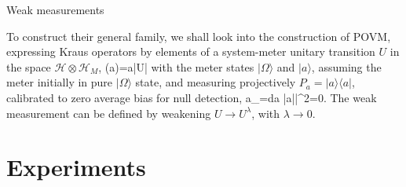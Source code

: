 \documentclass{beamer}
\def\be#1\ee{\begin{equation}#1\end{equation}}
\def\be#1\ee{\begin{equation}#1\end{equation}}
\def\be#1\ee{\begin{equation}#1\end{equation}}
\begin{document}
	\begin{frame}{Weak measurements}
		
		To construct their general family, we shall look into the construction of POVM,
		expressing Kraus operators by elements of a system-meter unitary transition $U$
		in the space $\mathcal H\otimes \mathcal H_M$, 
		\be
		K(a)=\langle a|U|\Omega\rangle\label{kra}
		\ee
		with the meter states $|\Omega\rangle$ and $|a\rangle$, assuming the meter initially in
		pure $|\Omega\rangle$ state, and measuring projectively $P_a=|a\rangle\langle a|$,
		calibrated to zero average bias for null detection,
		\be
		\langle a\rangle_\Omega=\int da\; |\langle a|\Omega\rangle|^2=0.\label{unbias}
		\ee
		The weak measurement can be defined by weakening $U\to U^\lambda$, with $\lambda \to 0$.
		
		
		
		
	\end{frame}

\section{Experiments}
\end{document}

